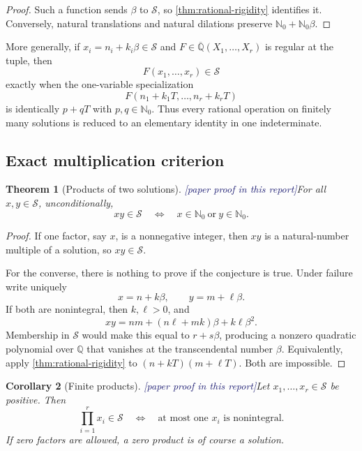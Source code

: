 \documentclass[11pt,oneside]{article}
\newtheorem{theorem}{Theorem}[section]
\newtheorem{corollary}[theorem]{Corollary}
\theoremstyle{definition}
\newcommand{\Nzero}{\mathbb N_0}
\newcommand{\Q}{\mathbb Q}
\newcommand{\Qbar}{\overline{\mathbb Q}}
\newcommand{\Sol}{\mathcal S}
\newcommand{\tagPaper}{\textcolor{MidnightBlue}{\textsf{[paper proof in this report]}}}
\begin{document}
\begin{proof}
Such a function sends \(\beta\) to \(\Sol\), so
\cref{thm:rational-rigidity} identifies it.  Conversely, natural translations and natural
dilations preserve \(\Nzero+\Nzero\beta\).
\end{proof}

More generally, if \(x_i=n_i+k_i\beta\in\Sol\) and
\(F\in\Qbar(X_1,\ldots,X_r)\) is regular at the tuple, then
\[
  F(x_1,\ldots,x_r)\in\Sol
\]
exactly when the one-variable specialization
\[
  F(n_1+k_1T,\ldots,n_r+k_rT)
\]
is identically \(p+qT\) with \(p,q\in\Nzero\).  Thus every rational operation on finitely
many solutions is reduced to an elementary identity in one indeterminate.

\subsection{Exact multiplication criterion}

\begin{theorem}[Products of two solutions]\label{thm:product-criterion}
\tagPaper For all \(x,y\in\Sol\), unconditionally,
\[
  \boxed{\quad
  xy\in\Sol
  \quad\Longleftrightarrow\quad
  x\in\Nzero\ \text{or}\ y\in\Nzero.
  \quad}
\]
\end{theorem}

\begin{proof}
If one factor, say \(x\), is a nonnegative integer, then \(xy\) is a natural-number
multiple of a solution, so \(xy\in\Sol\).

For the converse, there is nothing to prove if the conjecture is true.  Under failure write
uniquely
\[
  x=n+k\beta,
  \qquad y=m+\ell\beta.
\]
If both are nonintegral, then \(k,\ell>0\), and
\[
  xy=nm+(n\ell+mk)\beta+k\ell\beta^2.
\]
Membership in \(\Sol\) would make this equal to \(r+s\beta\), producing a nonzero
quadratic polynomial over \(\Q\) that vanishes at the transcendental number \(\beta\).
Equivalently, apply \cref{thm:rational-rigidity} to
\((n+kT)(m+\ell T)\).  Both are impossible.
\end{proof}

\begin{corollary}[Finite products]\label{cor:finite-products}
\tagPaper Let \(x_1,\ldots,x_r\in\Sol\) be positive.  Then
\[
  \prod_{i=1}^r x_i\in\Sol
  \quad\Longleftrightarrow\quad
  \text{at most one }x_i\text{ is nonintegral}.
\]
If zero factors are allowed, a zero product is of course a solution.
\end{corollary}
\end{document}
